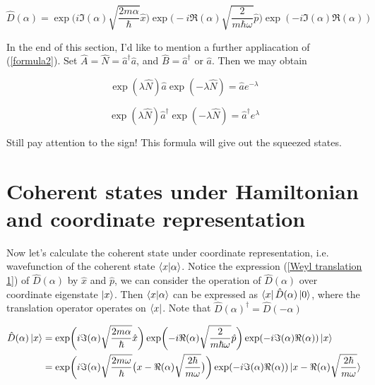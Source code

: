 \documentclass{article}
\begin{document}
        \begin{equation}\label{Weyl translation 2}
            \hat{D}(\alpha) = \exp\biggl(i\Im(\alpha)\sqrt{\frac{2m\alpha}{\hbar}}\hat{x}\biggr) \exp\biggl(-i\Re(\alpha)\sqrt{\frac{2}{m\hbar\omega}}\hat{p}\biggr) \exp(-i \Im(\alpha)\Re(\alpha))
        \end{equation}

        \vbox{}

        \vbox{}

        In the end of this section, I'd like to mention a further appliacation of (\ref{formula2}). Set $\hat{A}=\hat{N}=\hat{a}^\dagger\hat{a}$, and $\hat{B}=\hat{a}^\dagger$ or $\hat{a}$. Then we may obtain

        \begin{equation}
            \exp(\lambda\hat{N})\hat{a}\exp(-\lambda\hat{N}) = \hat{a} e^{-\lambda}
        \end{equation}

        \begin{equation}
            \exp(\lambda\hat{N})\hat{a}^\dagger\exp(-\lambda\hat{N}) = \hat{a}^\dagger e^{\lambda}
        \end{equation}

        Still pay attention to the sign! This formula will give out the squeezed states. 




    \section{Coherent states under Hamiltonian and coordinate representation}
        
        Now let's calculate the coherent state under coordinate representation, i.e. wavefunction of the coherent state $\braket{x|\alpha}$. Notice the expression (\ref{Weyl translation 1}) of $\hat{D}(\alpha)$ by $\hat{x}$ and $\hat{p}$, we can consider the operation of $\hat{D}(\alpha)$ over coordinate eigenstate $\ket{x}$. Then  $\braket{x|\alpha}$ can be expressed as $\bra{x}\hat{D}(\alpha)\ket{{0}}$, where the translation operator operates on $\bra{x}$. Note that $\hat{D}(\alpha)^\dagger=\hat{D}(-\alpha)$

        \begin{equation}
            \begin{split}    
                \hat{D}(\alpha)\ket{x} &= \exp\biggl(i\Im(\alpha)\sqrt{\frac{2m\alpha}{\hbar}}\hat{x}\biggr) \exp\biggl(-i\Re(\alpha)\sqrt{\frac{2}{m\hbar\omega}}\hat{p}\biggr) \exp(-i \Im(\alpha)\Re(\alpha)) \ket{x} \\
                    &= \exp\biggl(i\Im(\alpha)\sqrt{\frac{2m\omega}{\hbar}}\bigl(x-\Re(\alpha)\sqrt{\frac{2\hbar}{m\omega}}\bigr)\biggr) \exp(-i \Im(\alpha)\Re(\alpha)) \ket{x-\Re(\alpha)\sqrt{\frac{2\hbar}{m\omega}}} 
            \end{split}
        \end{equation}

        
        
\end{document}
